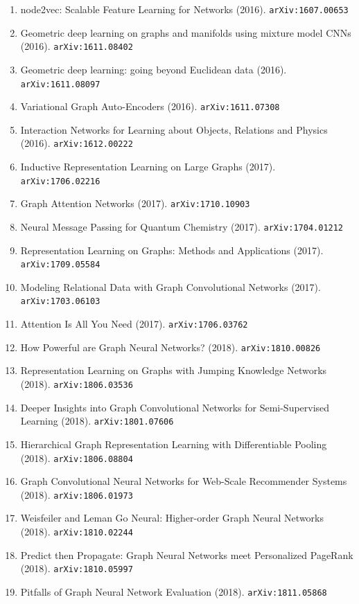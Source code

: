\documentclass[11pt]{article}
\begin{document}
\begin{enumerate}
  \item node2vec: Scalable Feature Learning for Networks (2016). \texttt{arXiv:1607.00653}
  \item Geometric deep learning on graphs and manifolds using mixture model CNNs (2016). \texttt{arXiv:1611.08402}
  \item Geometric deep learning: going beyond Euclidean data (2016). \texttt{arXiv:1611.08097}
  \item Variational Graph Auto-Encoders (2016). \texttt{arXiv:1611.07308}
  \item Interaction Networks for Learning about Objects, Relations and Physics (2016). \texttt{arXiv:1612.00222}
  \item Inductive Representation Learning on Large Graphs (2017). \texttt{arXiv:1706.02216}
  \item Graph Attention Networks (2017). \texttt{arXiv:1710.10903}
  \item Neural Message Passing for Quantum Chemistry (2017). \texttt{arXiv:1704.01212}
  \item Representation Learning on Graphs: Methods and Applications (2017). \texttt{arXiv:1709.05584}
  \item Modeling Relational Data with Graph Convolutional Networks (2017). \texttt{arXiv:1703.06103}
  \item Attention Is All You Need (2017). \texttt{arXiv:1706.03762}
  \item How Powerful are Graph Neural Networks? (2018). \texttt{arXiv:1810.00826}
  \item Representation Learning on Graphs with Jumping Knowledge Networks (2018). \texttt{arXiv:1806.03536}
  \item Deeper Insights into Graph Convolutional Networks for Semi-Supervised
  Learning (2018). \texttt{arXiv:1801.07606}
  \item Hierarchical Graph Representation Learning with Differentiable Pooling (2018). \texttt{arXiv:1806.08804}
  \item Graph Convolutional Neural Networks for Web-Scale Recommender Systems (2018). \texttt{arXiv:1806.01973}
  \item Weisfeiler and Leman Go Neural: Higher-order Graph Neural Networks (2018). \texttt{arXiv:1810.02244}
  \item Predict then Propagate: Graph Neural Networks meet Personalized PageRank (2018). \texttt{arXiv:1810.05997}
  \item Pitfalls of Graph Neural Network Evaluation (2018). \texttt{arXiv:1811.05868}

\end{enumerate}
\end{document}
